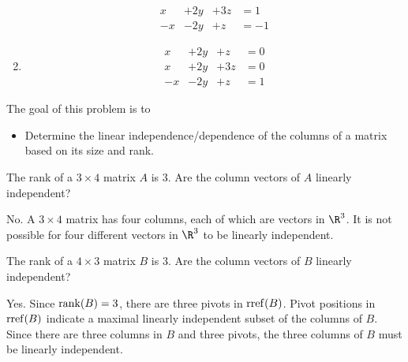 \begin{parts}
\begin{solution}
\begin{enumerate}
\begin{equation*}
\begin{array}{llll}
								x&+2y&+3z &= 1\\
								-x&-2y&+z &= -1
							\end{array}
						\end{equation*}
					\item
						\begin{equation*}
							\begin{array}{llll}
								x&+2y&+z &= 0\\
								x&+2y&+3z &= 0\\
								-x&-2y&+z &= 1
							\end{array}
						\end{equation*}
				\end{enumerate}
			\end{solution}
	\end{parts}

	\bookonlynewpage
	\question
	\begin{annotation}
		\begin{goals}

			The goal of this problem is to
			\begin{itemize}
				\item Determine the linear independence/dependence of the columns of a matrix
					based on its size and rank.
			\end{itemize}
		\end{goals}
	\end{annotation}
	\begin{parts}
		\item The rank of a $3\times 4$ matrix $A$ is $3$.
			Are the column vectors of $A$ linearly independent?
			\begin{solution}
				No. A $3 \times 4$ matrix has four columns, each of which are
				vectors in $\R^3$. It is not possible for four different vectors
				in $\R^3$ to be linearly independent.
			\end{solution}
		\item The rank of a $4\times 3$ matrix $B$ is $3$.
			Are the column vectors of $B$ linearly independent?
			\begin{solution}
				Yes. Since $\operatorname{rank}(B)=3$, there are three pivots in $\operatorname{rref}(B)$.
				Pivot positions in $\operatorname{rref}(B)$ indicate a maximal linearly
				independent subset of the columns of $B$. Since there are three
				columns in $B$ and three pivots, the three columns of $B$ must be
				linearly independent.
			\end{solution}
	\end{parts}


